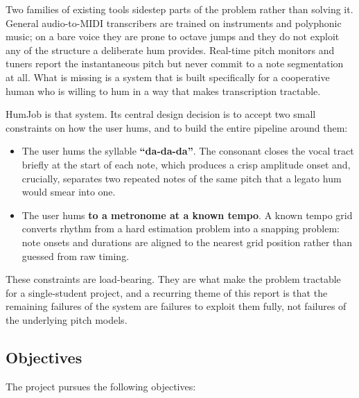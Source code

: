 \documentclass[12pt,a4paper]{article}
\begin{document}
Two families of existing tools sidestep parts of the problem rather than
solving it. General audio-to-MIDI transcribers are trained on instruments and
polyphonic music; on a bare voice they are prone to octave jumps and they do
not exploit any of the structure a deliberate hum provides. Real-time pitch
monitors and tuners report the instantaneous pitch but never commit to a note
segmentation at all. What is missing is a system that is built specifically for
a cooperative human who is willing to hum in a way that makes transcription
tractable.

HumJob is that system. Its central design decision is to accept two small
constraints on how the user hums, and to build the entire pipeline around them:

\begin{itemize}
    \item The user hums the syllable \textbf{``da-da-da''}. The consonant
    closes the vocal tract briefly at the start of each note, which produces a
    crisp amplitude onset and, crucially, separates two repeated notes of the
    same pitch that a legato hum would smear into one.
    \item The user hums \textbf{to a metronome at a known tempo}. A known
    tempo grid converts rhythm from a hard estimation problem into a snapping
    problem: note onsets and durations are aligned to the nearest grid
    position rather than guessed from raw timing.
\end{itemize}

These constraints are load-bearing. They are what make the problem tractable
for a single-student project, and a recurring theme of this report is that the
remaining failures of the system are failures to exploit them fully, not
failures of the underlying pitch models.

\subsection{Objectives}

The project pursues the following objectives:
\end{document}
